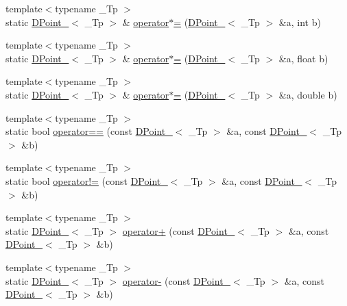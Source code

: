 \begin{DoxyCompactItemize}
\item 
{\footnotesize template$<$typename \-\_\-\-Tp $>$ }\\static \hyperlink{classnubot_1_1DPoint__}{D\-Point\-\_\-}$<$ \-\_\-\-Tp $>$ \& \hyperlink{namespacenubot_a713bac86edc7cd76ec0d01747eb665eb}{operator$\ast$=} (\hyperlink{classnubot_1_1DPoint__}{D\-Point\-\_\-}$<$ \-\_\-\-Tp $>$ \&a, int b)
\item 
{\footnotesize template$<$typename \-\_\-\-Tp $>$ }\\static \hyperlink{classnubot_1_1DPoint__}{D\-Point\-\_\-}$<$ \-\_\-\-Tp $>$ \& \hyperlink{namespacenubot_a20c7a21ca40e80113429b2565a7a2adc}{operator$\ast$=} (\hyperlink{classnubot_1_1DPoint__}{D\-Point\-\_\-}$<$ \-\_\-\-Tp $>$ \&a, float b)
\item 
{\footnotesize template$<$typename \-\_\-\-Tp $>$ }\\static \hyperlink{classnubot_1_1DPoint__}{D\-Point\-\_\-}$<$ \-\_\-\-Tp $>$ \& \hyperlink{namespacenubot_a1e26177670641c742e9632331addc7d2}{operator$\ast$=} (\hyperlink{classnubot_1_1DPoint__}{D\-Point\-\_\-}$<$ \-\_\-\-Tp $>$ \&a, double b)
\item 
{\footnotesize template$<$typename \-\_\-\-Tp $>$ }\\static bool \hyperlink{namespacenubot_a75e598a8e71a10c59ae03ba2159e5ea8}{operator==} (const \hyperlink{classnubot_1_1DPoint__}{D\-Point\-\_\-}$<$ \-\_\-\-Tp $>$ \&a, const \hyperlink{classnubot_1_1DPoint__}{D\-Point\-\_\-}$<$ \-\_\-\-Tp $>$ \&b)
\item 
{\footnotesize template$<$typename \-\_\-\-Tp $>$ }\\static bool \hyperlink{namespacenubot_a1496d5a6655274a731501fb46074f74b}{operator!=} (const \hyperlink{classnubot_1_1DPoint__}{D\-Point\-\_\-}$<$ \-\_\-\-Tp $>$ \&a, const \hyperlink{classnubot_1_1DPoint__}{D\-Point\-\_\-}$<$ \-\_\-\-Tp $>$ \&b)
\item 
{\footnotesize template$<$typename \-\_\-\-Tp $>$ }\\static \hyperlink{classnubot_1_1DPoint__}{D\-Point\-\_\-}$<$ \-\_\-\-Tp $>$ \hyperlink{namespacenubot_a327b80223b278da05a5494ac543f89b4}{operator+} (const \hyperlink{classnubot_1_1DPoint__}{D\-Point\-\_\-}$<$ \-\_\-\-Tp $>$ \&a, const \hyperlink{classnubot_1_1DPoint__}{D\-Point\-\_\-}$<$ \-\_\-\-Tp $>$ \&b)
\item 
{\footnotesize template$<$typename \-\_\-\-Tp $>$ }\\static \hyperlink{classnubot_1_1DPoint__}{D\-Point\-\_\-}$<$ \-\_\-\-Tp $>$ \hyperlink{namespacenubot_a217fff01127372a66bb46896e0d0a4f0}{operator-\/} (const \hyperlink{classnubot_1_1DPoint__}{D\-Point\-\_\-}$<$ \-\_\-\-Tp $>$ \&a, const \hyperlink{classnubot_1_1DPoint__}{D\-Point\-\_\-}$<$ \-\_\-\-Tp $>$ \&b)

\end{DoxyCompactItemize}

